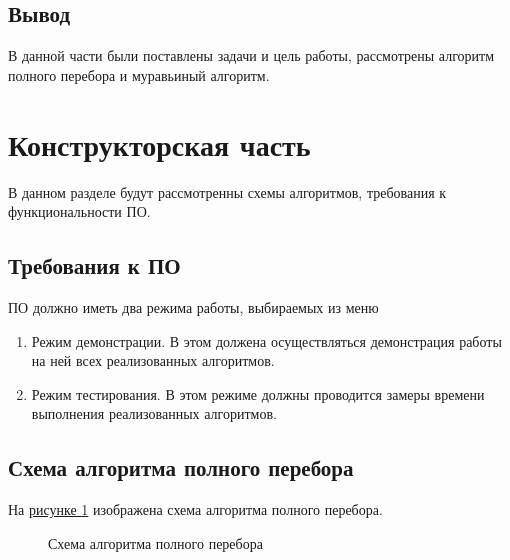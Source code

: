 \documentclass{article}
\begin{document}
	\subsection{Вывод}
	В данной части были поставлены задачи и цель работы, рассмотрены алгоритм полного перебора и муравьиный алгоритм.
		
	\newpage
	\section{Конструкторская часть}
		В данном разделе будут рассмотренны схемы алгоритмов, требования к функциональности ПО.
		\subsection{Требования к ПО} 
		ПО должно иметь два режима работы, выбираемых из меню
		\begin{enumerate}
			\item Режим демонстрации. В этом должена осуществляться демонстрация работы на ней всех реализованных алгоритмов.
		 	\item Режим тестирования. В этом режиме должны проводится замеры времени выполнения реализованных алгоритмов.
	 	\end{enumerate}
	 	
	 	\subsection{Схема алгоритма полного перебора}
	 	
	На \hyperref[fullAlgo]{рисунке  \ref{fullAlgo}} изображена схема алгоритма полного перебора.
	\begin{figure}[h!]
		\caption{Схема алгоритма полного перебора}
		\label{fullAlgo}
	\end{figure}
	\newpage
\end{document}
